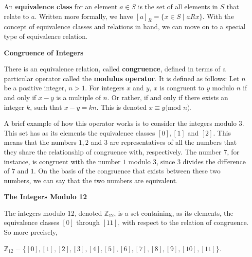 \documentclass[12pt, a4paper]{article}
\begin{document}
    An \textbf{equivalence class} for an element $a\in S$ is the set of all elements in $S$ that relate to $a$. Written more formally, we have $[a]_R=\{x\in S\mid aRx\}$. With the concept of equivalence classes and relations in hand, we can move on to a special type of equivalence relation.

\begin{flushleft}

    \textbf{\large{Congruence of Integers}}\normalsize
    
\end{flushleft}

    There is an equivalence relation, called \textbf{congruence}, defined in terms of a particular operator called the \textbf{modulus operator}. It is defined as follows: Let $n$ be a positive integer, $n>1$. For integers $x$ and $y$, $x$ is congruent to $y$ modulo $n$ if and only if $x-y$ is a multiple of $n$. Or rather, if and only if there exists an integer $k$, such that $x-y=kn$. This is denoted $x\equiv y($mod $n)$.\par
    
    A brief example of how this operator works is to consider the integers modulo 3. This set has as its elements the equivalence classes $[0],[1]$ and $[2]$. This means that the numbers $1,2$ and $3$ are representatives of all the numbers that they share the relationship of congruence with, respectively. The number $7$, for instance, is congruent with the number $1$ modulo 3, since $3$ divides the difference of $7$ and $1$. On the basis of the congruence that exists between these two numbers, we can say that the two numbers are equivalent.
    
\vspace{2mm}

\begin{flushleft}

    \textbf{\large{The Integers Modulo 12}}\normalsize
    
\end{flushleft}


    The integers modulo 12, denoted $\mathbb{Z}_{12}$, is a set containing, as its elements, the equivalence classes $[0]$ through $[11]$, with respect to the relation of congruence. So more precisely,\par
    
        \centerline{$\mathbb{Z}_{12}=\{[0],[1],[2],[3],[4],[5],[6],[7],[8],[9],[10],[11]\}$.}
        
\vspace{2mm}
\end{document}
